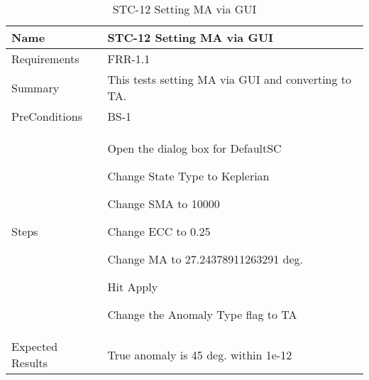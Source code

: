 

\begin{table}[htbp!]
\centering
      \begin{tabular}{|p{1.05 in} |p{4.75 in} |}
      \hline
         \rowcolor[rgb]{0.8,0.8,0.8} Name & STC-12 Setting MA via GUI \\    \hline
         Requirements & FRR-1.1 \\  \hline
         Summary &
         This tests setting MA via GUI and converting to TA.
         \\  \hline
         PreConditions & BS-1\\
         \hline
         Steps &
         \begin{compactenum}
             \item Open the dialog box for DefaultSC
             \item Change State Type to Keplerian
             \item Change SMA to 10000
             \item Change ECC to 0.25
             \item Change MA to 27.24378911263291 deg.
             \item Hit Apply 
             \item Change the Anomaly Type flag to TA
         \end{compactenum}
         \\ \hline
         Expected Results & True anomaly is 45 deg. within 1e-12 \\ \hline
\end{tabular}
      \label{Table: STC-12}
      \caption{STC-12 Setting MA via GUI}
\end{table} 